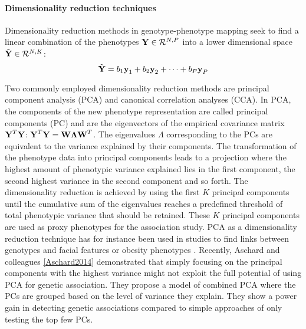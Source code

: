 \paragraph{Dimensionality reduction techniques}  
Dimensionality reduction methods in genotype-phenotype mapping seek to find a linear combination of the phenotypes \(\boldsymbol{\mathbf{Y}} \in \mathcal{R}^{N,P}\) into a lower dimensional space \(\tilde{\boldsymbol{\mathbf{Y}}} \in \mathcal{R}^{N,K}\):
\begin{equation}
\tilde{\boldsymbol{\mathbf{Y}}} = b_1\boldsymbol{\mathbf{y}}_1 + b_2\boldsymbol{\mathbf{y}}_2 + \dots + b_P\boldsymbol{\mathbf{y}}_P
\end{equation}

Two commonly employed dimensionality reduction methods are principal component analysis (PCA) and canonical correlation analyses (CCA). In PCA, the components of the new phenotype representation are called principal components (PC) and are the eigenvectors  of the empirical covariance matrix \(\boldsymbol{\mathbf{Y}}^T\boldsymbol{\mathbf{Y}}\): \(\boldsymbol{\mathbf{Y}}^T\boldsymbol{\mathbf{Y}} = \boldsymbol{\mathbf{W}}\boldsymbol{\mathbf{\Lambda}}\boldsymbol{\mathbf{W}}^T\). The eigenvalues \(\Lambda\) corresponding to the PCs are equivalent to the variance explained by their components. The transformation of the phenotype data into principal components leads to a projection where the highest amount of phenotypic variance explained lies in the first component, the second highest variance in the second component and so forth. The dimensionality reduction is achieved by using the first \(K\) principal components until the cumulative sum of the eigenvalues reaches a predefined threshold of total phenotypic variance that should be retained. These \(K\) principal components are used as proxy phenotypes for the association study. PCA as a dimensionality reduction technique has for instance been used in studies to find links between genotypes and facial features or obesity phenotypes \citep{Liu2012,Claes2014,He2008}. Recently, Aschard and colleagues \ref{Aschard2014} demonstrated that simply focusing on the principal components with the highest variance might not exploit the full potential of using PCA for genetic association. They propose a model of combined PCA where the PCs are grouped based on the level of variance they explain. They show a power gain in detecting genetic associations compared to simple approaches of only testing the top few PCs.

